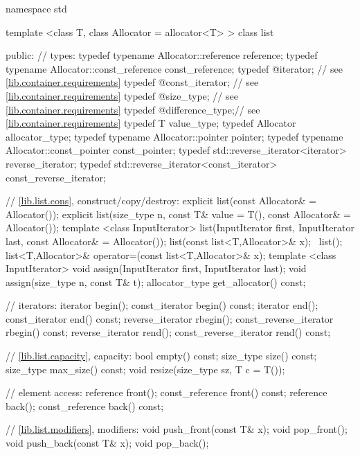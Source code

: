 \begin{codeblock}
namespace std {
  template <class T, class Allocator = allocator<T> >
  class list {
  public:
    // types:
    typedef typename Allocator::reference         reference;
    typedef typename Allocator::const_reference   const_reference;
    typedef @\impdef@                iterator;       // see \ref{lib.container.requirements}
    typedef @\impdef@                const_iterator; // see \ref{lib.container.requirements}
    typedef @\impdef@                size_type;      // see \ref{lib.container.requirements}
    typedef @\impdef@                difference_type;// see \ref{lib.container.requirements}
    typedef T                                     value_type;
    typedef Allocator                             allocator_type;
    typedef typename Allocator::pointer           pointer;
    typedef typename Allocator::const_pointer     const_pointer;
    typedef std::reverse_iterator<iterator>       reverse_iterator;
    typedef std::reverse_iterator<const_iterator> const_reverse_iterator;

    // \ref{lib.list.cons}, construct/copy/destroy:
    explicit list(const Allocator& = Allocator());
    explicit list(size_type n, const T& value = T(),
                  const Allocator& = Allocator());
    template <class InputIterator>
      list(InputIterator first, InputIterator last,
           const Allocator& = Allocator());
    list(const list<T,Allocator>& x);
   ~list();
    list<T,Allocator>& operator=(const list<T,Allocator>& x);
    template <class InputIterator>
      void assign(InputIterator first, InputIterator last);
    void assign(size_type n, const T& t);
    allocator_type get_allocator() const;

    // iterators:
    iterator               begin();
    const_iterator         begin() const;
    iterator               end();
    const_iterator         end() const;
    reverse_iterator       rbegin();
    const_reverse_iterator rbegin() const;
    reverse_iterator       rend();
    const_reverse_iterator rend() const;

    // \ref{lib.list.capacity}, capacity:
    bool      empty() const;
    size_type size() const;
    size_type max_size() const;
    void      resize(size_type sz, T c = T());

    // element access:
    reference       front();
    const_reference front() const;
    reference       back();
    const_reference back() const;

    // \ref{lib.list.modifiers}, modifiers:
    void push_front(const T& x);
    void pop_front();
    void push_back(const T& x);
    void pop_back();

}}
\end{codeblock}
